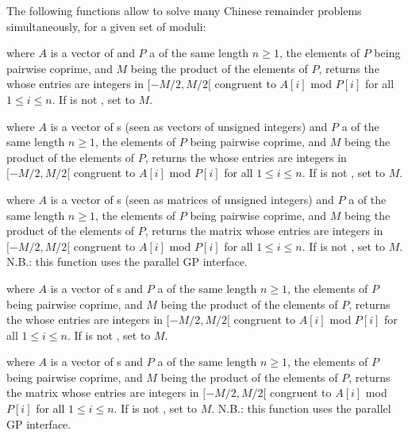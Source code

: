 The following functions allow to solve many Chinese remainder problems
simultaneously, for a given set of moduli:

where $A$ is a vector of 
and $P$ a  of the same length $n\ge 1$, the elements of $P$
being pairwise coprime, and $M$ being the product of the elements of $P$,
returns the  whose entries are integers in $[-M/2, M/2[$ congruent to $A[i]$
mod $P[i]$ for all $1\leq i\leq n$.
If  is not , set  to $M$.

 where $A$ is a
vector of s (seen as vectors of unsigned integers) and $P$ a
 of the same length $n\ge 1$, the elements of $P$ being
pairwise coprime, and $M$ being the product of the elements of $P$, returns
the  whose entries are integers in $[-M/2, M/2[$ congruent to $A[i]$
mod $P[i]$ for all $1\leq i\leq n$. If  is not , set
 to $M$.

 where $A$ is a
vector of s (seen as matrices of unsigned integers) and $P$ a
 of the same length $n\ge 1$, the elements of $P$ being
pairwise coprime, and $M$ being the product of the elements of $P$, returns
the matrix whose entries are integers in $[-M/2, M/2[$ congruent to $A[i]$
mod $P[i]$ for all $1\leq i\leq n$. If  is not , set
 to $M$. N.B.: this function uses the parallel GP interface.

 where $A$ is a
vector of s and $P$ a
 of the same length $n\ge 1$, the elements of $P$ being
pairwise coprime, and $M$ being the product of the elements of $P$, returns
the  whose entries are integers in $[-M/2, M/2[$ congruent to $A[i]$
mod $P[i]$ for all $1\leq i\leq n$. If  is not , set
 to $M$.

 where $A$ is a
vector of s and $P$ a
 of the same length $n\ge 1$, the elements of $P$ being
pairwise coprime, and $M$ being the product of the elements of $P$, returns
the matrix whose entries are integers in $[-M/2, M/2[$ congruent to $A[i]$
mod $P[i]$ for all $1\leq i\leq n$. If  is not , set
 to $M$. N.B.: this function uses the parallel GP interface.

